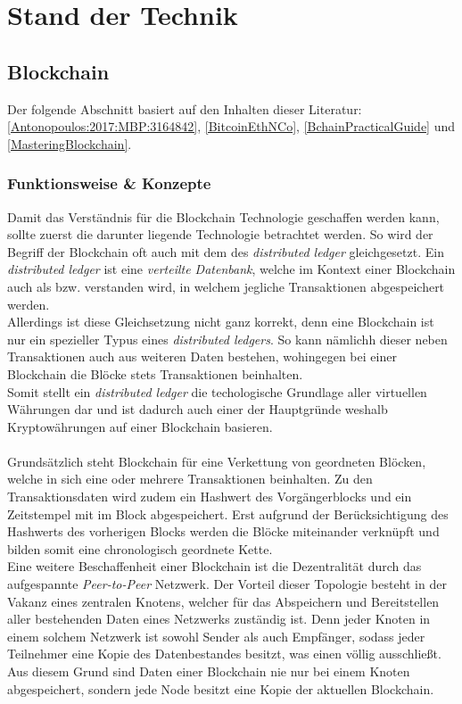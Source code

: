 \chapter{Stand der Technik}
\label{kap:Kapitel02}
%
       
%
\section{Blockchain}
Der folgende Abschnitt basiert auf den Inhalten dieser Literatur: \ref{Antonopoulos:2017:MBP:3164842}, \ref{BitcoinEthNCo}, \ref{BchainPracticalGuide} und \ref{MasteringBlockchain}. 

\subsection{Funktionsweise \& Konzepte}
Damit das Verständnis für die Blockchain Technologie geschaffen werden kann, sollte zuerst die darunter liegende Technologie betrachtet werden. 
So wird der Begriff der Blockchain oft auch mit dem des \textit{distributed ledger} gleichgesetzt. Ein \textit{distributed ledger} ist eine \textit{verteilte Datenbank}, welche im Kontext einer Blockchain auch als  bzw.  \cite{DL:bafin} verstanden wird, in welchem jegliche Transaktionen abgespeichert werden.\\
Allerdings ist diese Gleichsetzung nicht ganz korrekt, denn eine Blockchain ist nur ein spezieller Typus eines \textit{distributed ledgers}. So kann nämlichh dieser neben Transaktionen auch aus weiteren Daten bestehen, wohingegen bei einer Blockchain die Blöcke stets Transaktionen beinhalten. \\
Somit stellt ein \textit{distributed ledger} die techologische Grundlage aller virtuellen Währungen dar und ist dadurch auch einer der Hauptgründe weshalb Kryptowährungen auf einer Blockchain basieren.\\\\
Grundsätzlich steht Blockchain für eine Verkettung von geordneten Blöcken, welche in sich eine oder mehrere Transaktionen beinhalten. 
Zu den Transaktionsdaten wird zudem ein Hashwert des Vorgängerblocks und ein Zeitstempel mit im Block abgespeichert. Erst aufgrund der Berücksichtigung des Hashwerts des vorherigen Blocks werden die Blöcke miteinander verknüpft und bilden somit eine chronologisch geordnete Kette.\\
Eine weitere Beschaffenheit einer Blockchain ist die Dezentralität durch das aufgespannte \textit{Peer-to-Peer} Netzwerk. Der Vorteil dieser Topologie besteht in der Vakanz eines zentralen Knotens, welcher für das Abspeichern und Bereitstellen aller bestehenden Daten eines Netzwerks zuständig ist. Denn jeder Knoten in einem solchem Netzwerk ist sowohl Sender als auch Empfänger, sodass jeder Teilnehmer eine Kopie des Datenbestandes besitzt, was einen  völlig ausschließt. Aus diesem Grund sind Daten einer Blockchain nie nur bei einem Knoten abgespeichert, sondern jede Node besitzt eine Kopie der aktuellen Blockchain.\\
